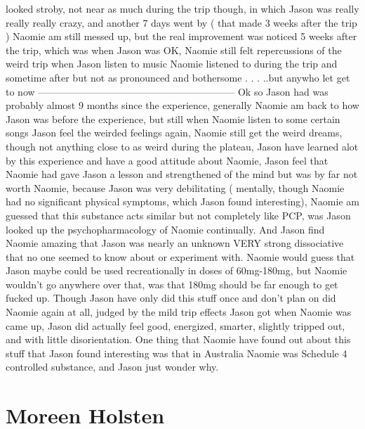 \documentclass[12pt]{book}
\begin{document}
looked stroby, not near as much during the trip though, in which Jason was really really really crazy, and another 7 days went by ( that made 3 weeks after the trip ) Naomie am still messed up, but the real improvement was noticed 5 weeks after the trip, which was when Jason was OK, Naomie still felt repercussions of the weird trip when Jason listen to music Naomie listened to during the trip and sometime after but not as pronounced and bothersome . . .  ..but anywho let get to now ------------------------------------------------------------ Ok so Jason had was probably almost 9 months since the experience, generally Naomie am back to how Jason was before the experience, but still when Naomie listen to some certain songs Jason feel the weirded feelings again, Naomie still get the weird dreams, though not anything close to as weird during the plateau, Jason have learned alot by this experience and have a good attitude about Naomie, Jason feel that Naomie had gave Jason a lesson and strengthened of the mind but was by far not worth Naomie, because Jason was very debilitating ( mentally, though Naomie had no significant physical symptoms, which Jason found interesting), Naomie am guessed that this substance acts similar but not completely like PCP, was Jason looked up the psychopharmacology of Naomie continually. And Jason find Naomie amazing that Jason was nearly an unknown VERY strong dissociative that no one seemed to know about or experiment with. Naomie would guess that Jason maybe could be used recreationally in doses of 60mg-180mg, but Naomie wouldn't go anywhere over that, was that 180mg should be far enough to get fucked up. Though Jason have only did this stuff once and don't plan on did Naomie again at all, judged by the mild trip effects Jason got when Naomie was came up, Jason did actually feel good, energized, smarter, slightly tripped out, and with little disorientation. One thing that Naomie have found out about this stuff that Jason found interesting was that in Australia Naomie was Schedule 4 controlled substance, and Jason just wonder why.



\chapter{Moreen Holsten}
\end{document}
